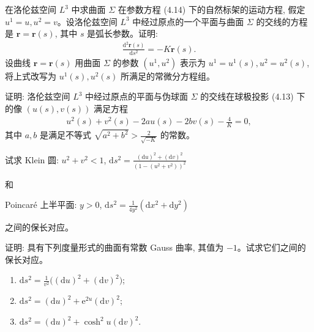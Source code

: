 \documentclass[../../main.tex]{subfiles}%
\begin{document}
\begin{example}
在洛伦兹空间 $L^3$ 中求曲面 $\Sigma$ 在参数方程 (4.14) 下的自然标架的运动方程, 假定 $u^1=u,u^2=v$。设洛伦兹空间 $L^3$ 中经过原点的一个平面与曲面 $\Sigma$ 的交线的方程是 $\boldsymbol{r}=\boldsymbol{r}(s)$, 其中 $s$ 是弧长参数。证明:
\begin{align*}
\frac{\mathrm{d}^2\boldsymbol{r}(s)}{\mathrm{d}s^2}=-K\boldsymbol{r}(s).
\end{align*}
设曲线 $\boldsymbol{r}=\boldsymbol{r}(s)$ 用曲面 $\Sigma$ 的参数 $(u^1,u^2)$ 表示为 $u^1=u^1(s),u^2=u^2(s)$, 将上式改写为 $u^1(s),u^2(s)$ 所满足的常微分方程组。
\end{example}

\begin{example}
证明: 洛伦兹空间 $L^3$ 中经过原点的平面与伪球面 $\Sigma$ 的交线在球极投影 (4.13) 下的像 $(u(s),v(s))$ 满足方程
\begin{align*}
u^2(s)+v^2(s)-2au(s)-2bv(s)-\frac{4}{K}=0,
\end{align*}
其中 $a,b$ 是满足不等式 $\sqrt{a^2+b^2}>\frac{2}{\sqrt{-K}}$ 的常数。
\end{example}

\begin{example}
试求
Klein 圆: $u^2+v^2<1$, $\mathrm{d}s^2=\frac{(\mathrm{d}u)^2+(\mathrm{d}v)^2}{(1-(u^2+v^2))^2}$

和

Poincaré 上半平面: $y>0$, $\mathrm{d}s^2=\frac{1}{4y^2}(\mathrm{d}x^2+\mathrm{d}y^2)$

之间的保长对应。
\end{example}

\begin{example}
证明: 具有下列度量形式的曲面有常数 Gauss 曲率, 其值为 $-1$。试求它们之间的保长对应。
\begin{enumerate}[(1)]
\item $\mathrm{d}s^2=\frac{1}{v^2}\big((\mathrm{d}u)^2+(\mathrm{d}v)^2\big)$;
\item $\mathrm{d}s^2=(\mathrm{d}u)^2+\mathrm{e}^{2u}(\mathrm{d}v)^2$;
\item $\mathrm{d}s^2=(\mathrm{d}u)^2+\cosh^2 u(\mathrm{d}v)^2$.
\end{enumerate}
\end{example}
\end{document}
